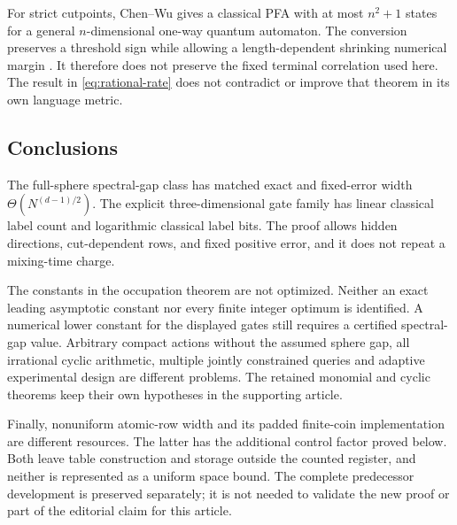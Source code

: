 For strict cutpoints, Chen--Wu \cite[Theorem 3.2]{CW26a} gives a
classical PFA with at most $n^2+1$ states for a general $n$-dimensional
one-way quantum automaton. The conversion preserves a threshold sign
while allowing a length-dependent shrinking numerical margin
\cite[Proposition 3.1]{CW26a}. It therefore does not preserve the fixed
terminal correlation used here. The result in \eqref{eq:rational-rate}
does not contradict or improve that theorem in its own language metric.

\subsection{Conclusions}
The full-sphere spectral-gap class has matched exact and fixed-error
width $\Theta(N^{(d-1)/2})$. The explicit three-dimensional gate family
has linear classical label count and logarithmic classical label bits.
The proof allows hidden directions, cut-dependent rows, and fixed
positive error, and it does not repeat a mixing-time charge.

The constants in the occupation theorem are not optimized. Neither an
exact leading asymptotic constant nor every finite integer optimum is
identified. A numerical lower constant for the displayed gates still
requires a certified spectral-gap value. Arbitrary compact actions
without the assumed sphere gap, all irrational cyclic arithmetic,
multiple jointly constrained queries and adaptive experimental design
are different problems. The retained monomial and cyclic theorems keep
their own hypotheses in the supporting article.

Finally, nonuniform atomic-row width and its padded finite-coin
implementation are different resources. The latter has the additional
control factor proved below. Both leave table construction and storage
outside the counted register, and neither is represented as a uniform
space bound. The complete predecessor development is preserved separately;
it is not needed to validate the new proof or part of the editorial
claim for this article.
